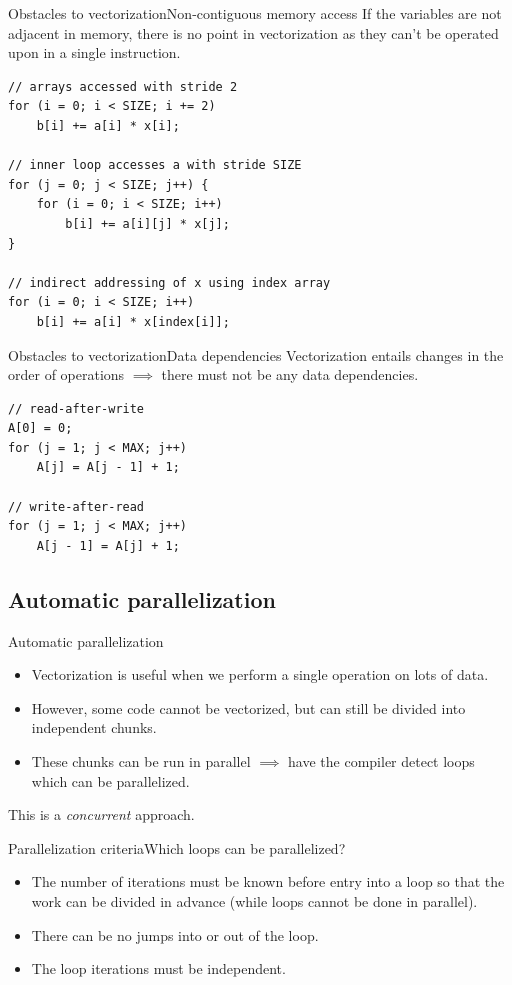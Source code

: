 \documentclass[serif, xcolor={svgnames, table}, usepdftitle=false]{beamer}
\begin{document}
\begin{frame}[fragile]{Obstacles to vectorization}{Non-contiguous
    memory access}
  If the variables are not adjacent in memory, there is no point in
  vectorization as they can't be operated upon in a single
  instruction.
\begin{verbatim}
// arrays accessed with stride 2
for (i = 0; i < SIZE; i += 2)
    b[i] += a[i] * x[i];

// inner loop accesses a with stride SIZE
for (j = 0; j < SIZE; j++) {
    for (i = 0; i < SIZE; i++)
        b[i] += a[i][j] * x[j];
}

// indirect addressing of x using index array
for (i = 0; i < SIZE; i++)
    b[i] += a[i] * x[index[i]];
\end{verbatim}
\end{frame}

\begin{frame}[fragile]{Obstacles to vectorization}{Data dependencies}
  Vectorization entails changes in the order of operations
  \(\implies\) there must not be any data dependencies.
\begin{verbatim}
// read-after-write
A[0] = 0;
for (j = 1; j < MAX; j++)
    A[j] = A[j - 1] + 1;

// write-after-read
for (j = 1; j < MAX; j++)
    A[j - 1] = A[j] + 1;
\end{verbatim}
\end{frame}

\subsection{Automatic parallelization}

\begin{frame}{Automatic parallelization}
  \begin{itemize}
  \item Vectorization is useful when we perform a single operation on
    lots of data.
  \item However, some code cannot be vectorized, but can still be
    divided into independent chunks.
  \item These chunks can be run in parallel \(\implies\) have the
    compiler detect loops which can be parallelized.
  \end{itemize}
  This is a \emph{concurrent} approach.
\end{frame}

\begin{frame}{Parallelization criteria}{Which loops can be
    parallelized?}
  \begin{itemize}
  \item The number of iterations must be known before entry into a
    loop so that the work can be divided in advance (while loops
    cannot be done in parallel).
  \item There can be no jumps into or out of the loop.
  \item The loop iterations must be independent.
  \end{itemize}
\end{frame}
\end{document}
